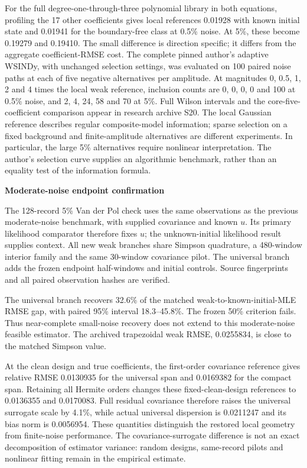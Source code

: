 \documentclass[
  american,
  11pt,
]{article}
\begin{document}
For the full degree-one-through-three polynomial library in both
equations, profiling the 17 other coefficients gives local references
0.01928 with known initial state and 0.01941 for the boundary-free class
at 0.5\% noise. At 5\%, these become 0.19279 and 0.19410. The small
difference is direction specific; it differs from the aggregate
coefficient-RMSE cost. The complete pinned author's adaptive WSINDy,
with unchanged selection settings, was evaluated on 100 paired noise
paths at each of five negative alternatives per amplitude. At magnitudes
0, 0.5, 1, 2 and 4 times the local weak reference, inclusion counts are
0, 0, 0, 0 and 100 at 0.5\% noise, and 2, 4, 24, 58 and 70 at 5\%. Full
Wilson intervals and the core-five-coefficient comparison appear in
research archive S20. The local Gaussian reference describes regular
composite-model information; sparse selection on a fixed background and
finite-amplitude alternatives are different experiments. In particular,
the large 5\% alternatives require nonlinear interpretation. The
author's selection curve supplies an algorithmic benchmark, rather than
an equality test of the information formula.

\textbf{Moderate-noise endpoint confirmation}

The 128-record 5\% Van der Pol check uses the same observations as the
previous moderate-noise benchmark, with supplied covariance and known
\(u\). Its primary likelihood comparator therefore fixes \(u\); the
unknown-initial likelihood result supplies context. All new weak
branches share Simpson quadrature, a 480-window interior family and the
same 30-window covariance pilot. The universal branch adds the frozen
endpoint half-windows and initial controls. Source fingerprints and all
paired observation hashes are verified.

The universal branch recovers 32.6\% of the matched
weak-to-known-initial-MLE RMSE gap, with paired 95\% interval
18.3--45.8\%. The frozen 50\% criterion fails. Thus near-complete
small-noise recovery does not extend to this moderate-noise feasible
estimator. The archived trapezoidal weak RMSE, 0.0255834, is close to
the matched Simpson value.

At the clean design and true coefficients, the first-order covariance
reference gives relative RMSE 0.0130935 for the universal span and
0.0169382 for the compact span. Retaining all Hermite orders changes
these fixed-clean-design references to 0.0136355 and 0.0170083. Full
residual covariance therefore raises the universal surrogate scale by
4.1\%, while actual universal dispersion is 0.0211247 and its bias norm
is 0.0056954. These quantities distinguish the restored local geometry
from finite-noise performance. The covariance-surrogate difference is
not an exact decomposition of estimator variance: random designs,
same-record pilots and nonlinear fitting remain in the empirical
estimate.
\end{document}
